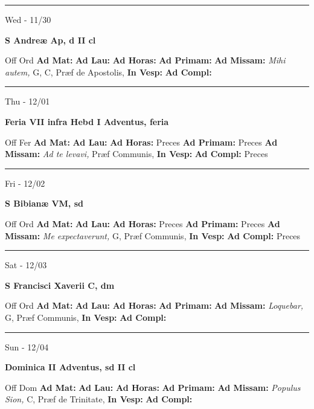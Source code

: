 \documentclass[letterpaper, 10pt]{article}
\begin{document}
\hrule
\begin{center}
Wed - 11/30
\end{center}\textbf{ \large S Andreæ Ap, \textnormal{\normalsize d II cl}}
\begin{justify}
Off Ord
\textbf{Ad Mat: }
\textbf{Ad Lau: }
\textbf{Ad Horas: }
\textbf{Ad Primam: }
\textbf{Ad Missam:} \textit{Mihi autem, } G, C, Præf de Apostolis, 
\textbf{In Vesp: }
\textbf{Ad Compl: }\end{justify}



\hrule
\begin{center}
Thu - 12/01
\end{center}\textbf{ \large Feria VII infra Hebd I Adventus, \textnormal{\normalsize feria}}
\begin{justify}
Off Fer
\textbf{Ad Mat: }
\textbf{Ad Lau: }
\textbf{Ad Horas: }Preces
\textbf{Ad Primam: }Preces
\textbf{Ad Missam:} \textit{Ad te levavi, } Præf Communis, 
\textbf{In Vesp: }
\textbf{Ad Compl: }Preces\end{justify}



\hrule
\begin{center}
Fri - 12/02
\end{center}\textbf{ \large S Bibianæ VM, \textnormal{\normalsize sd}}
\begin{justify}
Off Ord
\textbf{Ad Mat: }
\textbf{Ad Lau: }
\textbf{Ad Horas: }Preces
\textbf{Ad Primam: }Preces
\textbf{Ad Missam:} \textit{Me expectaverunt, } G, Præf Communis, 
\textbf{In Vesp: }
\textbf{Ad Compl: }Preces\end{justify}



\hrule
\begin{center}
Sat - 12/03
\end{center}\textbf{ \large S Francisci Xaverii C, \textnormal{\normalsize dm}}
\begin{justify}
Off Ord
\textbf{Ad Mat: }
\textbf{Ad Lau: }
\textbf{Ad Horas: }
\textbf{Ad Primam: }
\textbf{Ad Missam:} \textit{Loquebar, } G, Præf Communis, 
\textbf{In Vesp: }
\textbf{Ad Compl: }\end{justify}



\hrule
\begin{center}
Sun - 12/04
\end{center}\textbf{ \large Dominica II Adventus, \textnormal{\normalsize sd II cl}}
\begin{justify}
Off Dom
\textbf{Ad Mat: }
\textbf{Ad Lau: }
\textbf{Ad Horas: }
\textbf{Ad Primam: }
\textbf{Ad Missam:} \textit{Populus Sion, } C, Præf de Trinitate, 
\textbf{In Vesp: }
\textbf{Ad Compl: }\end{justify}
\end{document}
